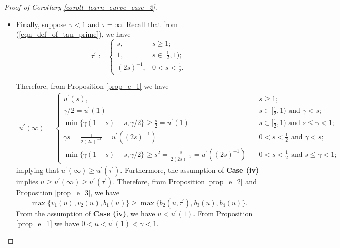\documentclass{article}
\theoremstyle{plain}
\theoremstyle{definition}
\theoremstyle{remark}
\newcommand{\green}{\color{green}}
\begin{document}
\begin{appendix}
\begin{proof}[Proof of Corollary \ref{coroll_learn_curve_case_2}]
\begin{itemize}
\begin{itemize}
\begin{itemize}
    \end{itemize}

\end{itemize}

    \item[(c)] Finally, suppose $\gamma<1$ and $\tau = \infty$. Recall that from (\ref{eqn_def_of_tau_prime}), we have
    $$
        \tau^{\prime}:= 
        \left\{\begin{matrix}
s, &  s \geq 1;\\
1, &  s \in [\frac{1}{2}, 1);\\
(2s)^{-1}, &  0 < s < \frac{1}{2}.
\end{matrix}\right.
        $$


 Therefore, from Proposition \ref{prop_e_1} we have
    \begin{align*}
    u^{\prime}(\infty) =
    \left\{\begin{matrix}
    u^{\prime}(s), & \quad s \geq 1;\\
\gamma/2 = u^{\prime}(1) & \quad s \in [\frac{1}{2}, 1) \text{ and } \gamma < s;\\
\min\{\gamma (1+s)-s, \gamma / 2 \} \geq \frac{s}{2} = u^{\prime}(1) & \quad s \in [\frac{1}{2}, 1) \text{ and } s \leq \gamma < 1;\\
\gamma s = \frac{\gamma}{2(2s)^{-1}} = u^{\prime}((2s)^{-1}) & \quad 0 < s < \frac{1}{2} \text{ and } \gamma < s;\\
\min\{\gamma (1+s)-s, \gamma / 2 \} \geq s^2 = \frac{s}{2(2s)^{-1}} = u^{\prime}((2s)^{-1}) & \quad 0 < s < \frac{1}{2} \text{ and } s \leq \gamma < 1;
\end{matrix}\right.
\end{align*}
implying that $u^{\prime}(\infty) \geq u^{\prime}(\tau^{\prime})$. 
Furthermore, the assumption of {\bf Case (iv)} implies $u \geq u^{\prime}(\infty)\geq u^{\prime}(\tau^{\prime})$. 
Therefore, from Proposition \ref{prop_e_2} and Proposition \ref{prop_e_3}, we have
\begin{equation*}
    \max\{v_1(u), v_2(u), b_1(u)\} \geq \max\{b_2(u, \tau^{\prime}), b_3(u), b_4(u)\}.
\end{equation*}
From the assumption of {\bf Case (iv)}, we have
$u<u^{\prime}(1)$. From Proposition \ref{prop_e_1} we have $0<u<u^{\prime}(1) <\gamma<1$.


\end{itemize}
\end{proof}
\end{appendix}
\end{document}
